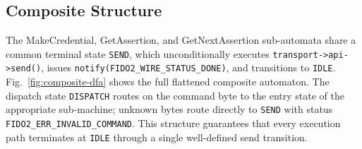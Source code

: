 \subsection{Composite Structure}
\label{sec:formal:composite}

The MakeCredential, GetAssertion, and GetNextAssertion
sub-automata share a common terminal state \texttt{SEND},
which unconditionally executes
\texttt{transport\allowbreak->api\allowbreak->send()},
issues \texttt{notify(FIDO2\_WIRE\_STATUS\_DONE)}, and
transitions to \texttt{IDLE}.
Fig.~\ref{fig:composite-dfa} shows the full flattened
composite automaton.
The dispatch state \texttt{DISPATCH} routes on the command
byte to the entry state of the appropriate sub-machine;
unknown bytes route directly to \texttt{SEND} with status
\texttt{FIDO2\_ERR\_INVALID\_COMMAND}.
This structure guarantees that every execution path
terminates at \texttt{IDLE} through a single well-defined
send transition.

